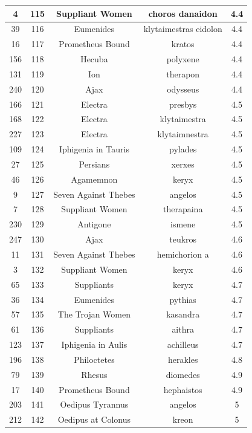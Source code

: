 \documentclass{jcls}
\begin{document}
\begin{longtable}{|c|c|c|c|c|}
  4 & 115 & Suppliant Women & choros danaidon & 4.4 \\ \hline
  39 & 116 & Eumenides & klytaimestras eidolon & 4.4 \\ \hline
  16 & 117 & Prometheus Bound & kratos & 4.4 \\ \hline
  156 & 118 & Hecuba & polyxene & 4.4 \\ \hline
  131 & 119 & Ion & therapon & 4.4 \\ \hline
  240 & 120 & Ajax & odysseus & 4.4 \\ \hline
  166 & 121 & Electra & presbys & 4.5 \\ \hline
  168 & 122 & Electra & klytaimestra & 4.5 \\ \hline
  227 & 123 & Electra & klytaimnestra & 4.5 \\ \hline
  109 & 124 & Iphigenia in Tauris & pylades & 4.5 \\ \hline
  27 & 125 & Persians & xerxes & 4.5 \\ \hline
  46 & 126 & Agamemnon & keryx & 4.5 \\ \hline
  9 & 127 & Seven Against Thebes & angelos & 4.5 \\ \hline
  7 & 128 & Suppliant Women & therapaina & 4.5 \\ \hline
  230 & 129 & Antigone & ismene & 4.5 \\ \hline
  247 & 130 & Ajax & teukros & 4.6 \\ \hline
  11 & 131 & Seven Against Thebes & hemichorion a & 4.6 \\ \hline
  3 & 132 & Suppliant Women & keryx & 4.6 \\ \hline
  65 & 133 & Suppliants & keryx & 4.7 \\ \hline
  36 & 134 & Eumenides & pythias & 4.7 \\ \hline
  57 & 135 & The Trojan Women & kasandra & 4.7 \\ \hline
  61 & 136 & Suppliants & aithra & 4.7 \\ \hline
  123 & 137 & Iphigenia in Aulis & achilleus & 4.7 \\ \hline
  196 & 138 & Philoctetes & herakles & 4.8 \\ \hline
  79 & 139 & Rhesus & diomedes & 4.9 \\ \hline
  17 & 140 & Prometheus Bound & hephaistos & 4.9 \\ \hline
  203 & 141 & Oedipus Tyrannus & angelos & 5 \\ \hline
  212 & 142 & Oedipus at Colonus & kreon & 5 \\ \hline

\end{longtable}
\end{document}
